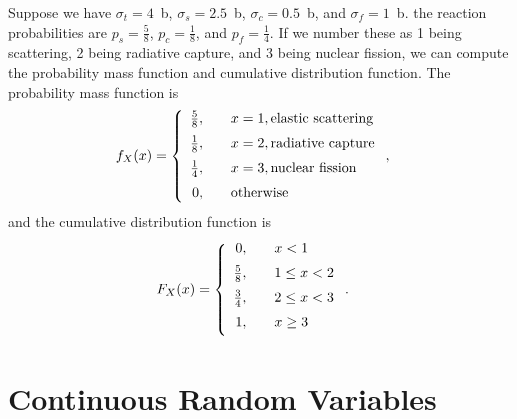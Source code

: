 Suppose we have $\sigma_t = 4$~b, $\sigma_s = 2.5$~b, $\sigma_c = 0.5$~b, and $\sigma_f = 1$~b. the reaction probabilities are $p_s = \tfrac{5}{8}$, $p_c = \tfrac{1}{8}$, and $p_f = \tfrac{1}{4}$. If we number these as 1 being scattering, 2 being radiative capture, and 3 being nuclear fission, we can compute the probability mass function and cumulative distribution function. The probability mass function is
\begin{align}
  f_X(x) &= \left\{ \begin{array}{r l}
  \frac{5}{8},  & \quad x = 1, \text{elastic scattering} \vspace{0.2cm} \\
  \frac{1}{8},  & \quad x = 2, \text{radiative capture} \vspace{0.2cm} \\
  \frac{1}{4},  & \quad x = 3, \text{nuclear fission} \vspace{0.2cm} \\
  0,            & \quad \text{otherwise} \\ \end{array} \right. ,
\end{align}
and the cumulative distribution function is
\begin{align}
  F_X(x) &= \left\{ \begin{array}{r l}
  0, & \quad x < 1 \vspace{0.2cm} \\
  \frac{5}{8},   & \quad 1  \le x < 2  \vspace{0.2cm} \\ 
  \frac{3}{4},   & \quad 2  \le x < 3  \vspace{0.2cm} \\ 
  1,             & \quad x \ge 3  \vspace{0.2cm} \\ \end{array} \right. .
\end{align}



\section{Continuous Random Variables}

